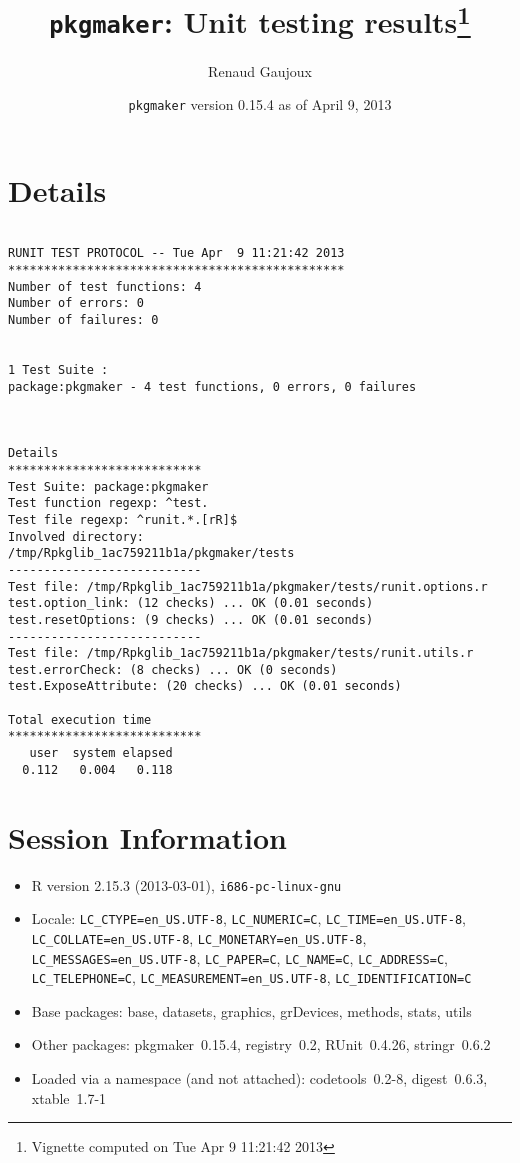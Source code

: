 \documentclass[10pt]{article}
\author{Renaud Gaujoux}
\title{\texttt{pkgmaker}: Unit testing results\footnote{Vignette computed  on Tue Apr  9 11:21:42 2013}}
\date{\texttt{pkgmaker} version 0.15.4 as of April  9, 2013}
\begin{document}
\maketitle

\section{Details}
\begin{verbatim}

RUNIT TEST PROTOCOL -- Tue Apr  9 11:21:42 2013 
*********************************************** 
Number of test functions: 4 
Number of errors: 0 
Number of failures: 0 

 
1 Test Suite : 
package:pkgmaker - 4 test functions, 0 errors, 0 failures



Details 
*************************** 
Test Suite: package:pkgmaker 
Test function regexp: ^test. 
Test file regexp: ^runit.*.[rR]$ 
Involved directory: 
/tmp/Rpkglib_1ac759211b1a/pkgmaker/tests 
--------------------------- 
Test file: /tmp/Rpkglib_1ac759211b1a/pkgmaker/tests/runit.options.r 
test.option_link: (12 checks) ... OK (0.01 seconds)
test.resetOptions: (9 checks) ... OK (0.01 seconds)
--------------------------- 
Test file: /tmp/Rpkglib_1ac759211b1a/pkgmaker/tests/runit.utils.r 
test.errorCheck: (8 checks) ... OK (0 seconds)
test.ExposeAttribute: (20 checks) ... OK (0.01 seconds)

Total execution time
***************************
   user  system elapsed 
  0.112   0.004   0.118 

\end{verbatim}

\section*{Session Information}
\begin{itemize}\raggedright
  \item R version 2.15.3 (2013-03-01), \verb|i686-pc-linux-gnu|
  \item Locale: \verb|LC_CTYPE=en_US.UTF-8|, \verb|LC_NUMERIC=C|, \verb|LC_TIME=en_US.UTF-8|, \verb|LC_COLLATE=en_US.UTF-8|, \verb|LC_MONETARY=en_US.UTF-8|, \verb|LC_MESSAGES=en_US.UTF-8|, \verb|LC_PAPER=C|, \verb|LC_NAME=C|, \verb|LC_ADDRESS=C|, \verb|LC_TELEPHONE=C|, \verb|LC_MEASUREMENT=en_US.UTF-8|, \verb|LC_IDENTIFICATION=C|
  \item Base packages: base, datasets, graphics, grDevices, methods,
    stats, utils
  \item Other packages: pkgmaker~0.15.4, registry~0.2, RUnit~0.4.26,
    stringr~0.6.2
  \item Loaded via a namespace (and not attached): codetools~0.2-8,
    digest~0.6.3, xtable~1.7-1
\end{itemize}
\end{document}
